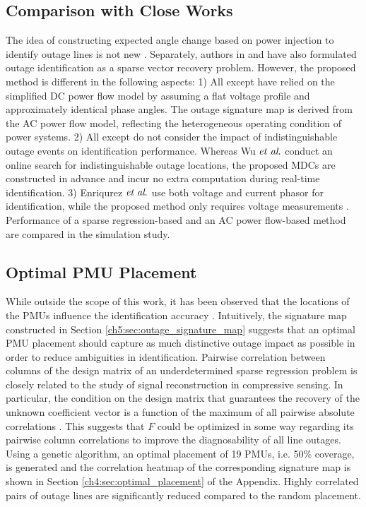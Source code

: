 \subsection{Comparison with Close Works} %
The idea of constructing expected angle change based on power injection to identify outage lines is not new \cite{Tate2008,Wu2015,Costilla-Enriquez2019}. Separately, authors in \cite{Zhu2012} and \cite{Chen2014} have also formulated outage identification as a sparse vector recovery problem. However, the proposed method is different in the following aspects: 1) All except \cite{Costilla-Enriquez2019} have relied on the simplified DC power flow model by assuming a flat voltage profile and approximately identical phase angles. The outage signature map is derived from the AC power flow model, reflecting the heterogeneous operating condition of power systems. 2) All except \cite{Wu2015} do not consider the impact of indistinguishable outage events on identification performance. Whereas Wu $\textit{et al}.$ conduct an online search for indistinguishable outage locations, the proposed MDCs are constructed in advance and incur no extra computation during real-time identification. 3) Enriqurez $\textit{et al}.$ use both voltage and current phasor for identification, while the proposed method only requires voltage measurements \cite{Costilla-Enriquez2019}. Performance of a sparse regression-based \cite{Zhu2012} and an AC power flow-based method \cite{Costilla-Enriquez2019} are compared in the simulation study.

\subsection{Optimal PMU Placement} While outside the scope of this work, it has been observed that the locations of the PMUs influence the identification accuracy \cite{yang2020optimal}. Intuitively, the signature map constructed in Section \ref{ch5:sec:outage_signature_map} suggests that an optimal PMU placement should capture as much distinctive outage impact as possible in order to reduce ambiguities in identification. Pairwise correlation between columns of the design matrix of an underdetermined sparse regression problem is closely related to the study of signal reconstruction in compressive sensing. In particular, the condition on the design matrix that guarantees the recovery of the unknown coefficient vector is a function of the maximum of all pairwise absolute correlations \cite{bastani2016compressive}. This suggests that $F$ could be optimized in some way regarding its pairwise column correlations to improve the diagnosability of all line outages. Using a genetic algorithm, an optimal placement of 19 PMUs, i.e. 50\% coverage, is generated and the correlation heatmap of the corresponding signature map is shown in Section \ref{ch4:sec:optimal_placement} of the Appendix. Highly correlated pairs of outage lines are significantly reduced compared to the random placement. 

